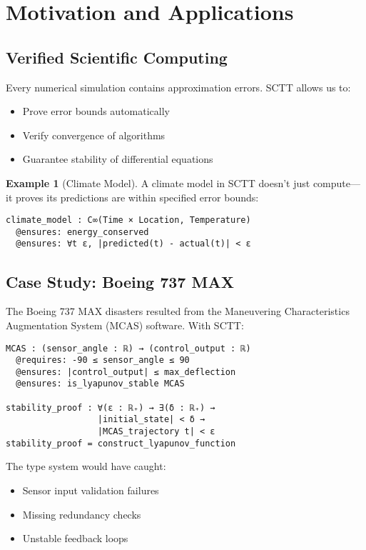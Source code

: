 \documentclass[12pt,openright,twoside]{book}
\theoremstyle{plain}
\theoremstyle{definition}
\newtheorem{example}[theorem]{Example}
\theoremstyle{remark}
\begin{document}
\section{Motivation and Applications}
\label{sec:motivation}

\subsection{Verified Scientific Computing}

Every numerical simulation contains approximation errors. SCTT allows us to:
\begin{itemize}
\item Prove error bounds automatically
\item Verify convergence of algorithms
\item Guarantee stability of differential equations
\end{itemize}

\begin{example}[Climate Model]
A climate model in SCTT doesn't just compute—it proves its predictions are within specified error bounds:
\begin{lstlisting}
climate_model : C∞(Time × Location, Temperature)
  @ensures: energy_conserved
  @ensures: ∀t ε, |predicted(t) - actual(t)| < ε
\end{lstlisting}
\end{example}

\subsection{Case Study: Boeing 737 MAX}

The Boeing 737 MAX disasters resulted from the Maneuvering Characteristics Augmentation System (MCAS) software. With SCTT:

\begin{lstlisting}[caption={MCAS control law with stability proof}]
MCAS : (sensor_angle : ℝ) → (control_output : ℝ)
  @requires: -90 ≤ sensor_angle ≤ 90
  @ensures: |control_output| ≤ max_deflection
  @ensures: is_lyapunov_stable MCAS

stability_proof : ∀(ε : ℝ₊) → ∃(δ : ℝ₊) →
                  |initial_state| < δ → 
                  |MCAS_trajectory t| < ε
stability_proof = construct_lyapunov_function
\end{lstlisting}

The type system would have caught:
\begin{itemize}
\item Sensor input validation failures
\item Missing redundancy checks
\item Unstable feedback loops
\end{itemize}
\end{document}
